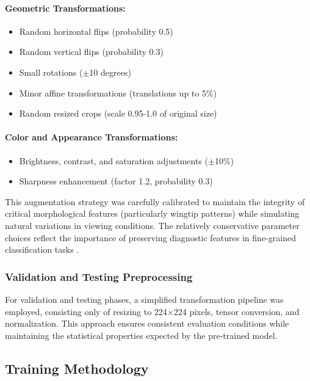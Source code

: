 \documentclass[a4paper,12pt]{article}
\begin{document}
\paragraph{Geometric Transformations:}
\begin{itemize}
    \item Random horizontal flips (probability 0.5)
    \item Random vertical flips (probability 0.3)
    \item Small rotations ($\pm$10 degrees)
    \item Minor affine transformations (translations up to 5\%)
    \item Random resized crops (scale 0.95-1.0 of original size)
\end{itemize}

\paragraph{Color and Appearance Transformations:}
\begin{itemize}
    \item Brightness, contrast, and saturation adjustments ($\pm$10\%)
    \item Sharpness enhancement (factor 1.2, probability 0.3)
\end{itemize}

This augmentation strategy was carefully calibrated to maintain the integrity of critical morphological features (particularly wingtip patterns) while simulating natural variations in viewing conditions. The relatively conservative parameter choices reflect the importance of preserving diagnostic features in fine-grained classification tasks \citep{wang2022bird}.

\subsubsection{Validation and Testing Preprocessing}

For validation and testing phases, a simplified transformation pipeline was employed, consisting only of resizing to 224$\times$224 pixels, tensor conversion, and normalization. This approach ensures consistent evaluation conditions while maintaining the statistical properties expected by the pre-trained model.

\subsection{Training Methodology}
\end{document}
